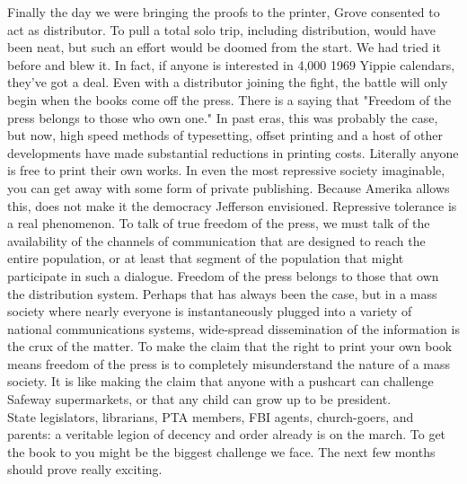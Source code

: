 \documentclass[11pt,twoside,a4paper]{book}
\begin{document}
Finally the day we were bringing the proofs to the printer, Grove consented to act as distributor. To pull a total solo trip, including distribution, would have been neat, but such an effort would be doomed from the start. We had tried it before and blew it. In fact, if anyone is interested in 4,000 1969 Yippie calendars, they've got a deal. Even with a distributor joining the fight, the battle will only begin when the books come off the press. There is a saying that "Freedom of the press belongs to those who own one." In past eras, this was probably the case, but now, high speed methods of typesetting, offset printing and a host of other developments have made substantial reductions in printing costs. Literally anyone is free to print their own works. In even the most repressive society imaginable, you can get away with some form of private publishing. Because Amerika allows this, does not make it the democracy Jefferson envisioned. Repressive tolerance is a real phenomenon. To talk of true freedom of the press, we must talk of the availability of the channels of communication that are designed to reach the entire population, or at least that segment of the population that might participate in such a dialogue. Freedom of the press belongs to those that own the distribution system. Perhaps that has always been the case, but in a mass society where nearly everyone is instantaneously plugged into a variety of national communications systems, wide-spread dissemination of the information is the crux of the matter. To make the claim that the right to print your own book means freedom of the press is to completely misunderstand the nature of a mass society. It is like making the claim that anyone with a pushcart can challenge Safeway supermarkets, or that any child can grow up to be president.~\\

State legislators, librarians, PTA members, FBI agents, church-goers, and parents: a veritable legion of decency and order already is on the march. To get the book to you might be the biggest challenge we face. The next few months should prove really exciting.~\\

\clearpage
\end{document}
